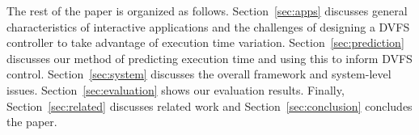 The rest of the paper is organized as follows. Section~\ref{sec:apps} discusses
general characteristics of interactive applications and the challenges of
designing a DVFS controller to take advantage of execution time variation.
Section~\ref{sec:prediction} discusses our method of predicting execution time
and using this to inform DVFS control. Section~\ref{sec:system} discusses the
overall framework and system-level issues. Section~\ref{sec:evaluation} shows
our evaluation results. Finally, Section~\ref{sec:related} discusses 
related work and Section~\ref{sec:conclusion} concludes the paper.
